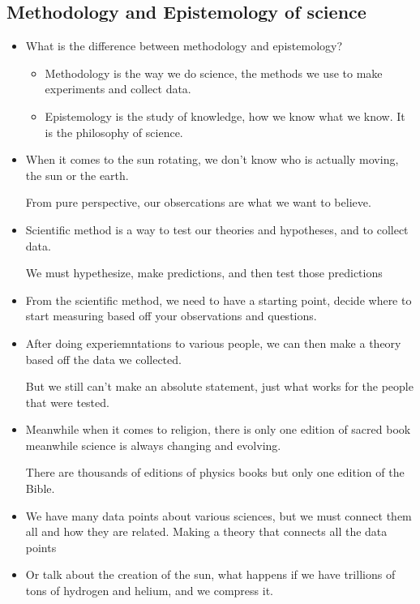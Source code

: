 \documentclass{article}
\begin{document}
\subsection{Methodology and Epistemology of science}

\begin{itemize}
  \item What is the difference between methodology and epistemology?
    \begin{itemize}
      \item Methodology is the way we do science, the methods we use to
        make experiments and collect data.


      \item Epistemology is the study of knowledge, how we know what we know.
        It is the philosophy of science.
    \end{itemize}
  \item When it comes to the sun rotating, we don't know
    who is actually moving, the sun or the earth.

    From pure perspective, our obsercations are what we want to believe.
  \item Scientific method is a way to test our theories
    and hypotheses, and to collect data.

    We must hypethesize, make predictions, and then test those predictions

  \item From the scientific method, we need to have a starting
    point, decide where to start measuring based off your observations and questions.
  \item After doing experiemntations to various people, we can
    then make a theory based off the data we collected.

    But we still can't make an absolute statement, just what works for the
    people that were tested.
  \item Meanwhile when it comes to religion, there is only one edition of sacred book meanwhile
    science is always changing and evolving.

    There are thousands of editions of physics books but only one edition of the Bible.
  \item We have many data points about various sciences,
    but we must connect them all and how they are related.
    Making a theory that connects all the data points
  \item Or talk about the creation of the sun,
    what happens if we have trillions of tons of
    hydrogen and helium, and we compress it.


\end{itemize}
\end{document}
